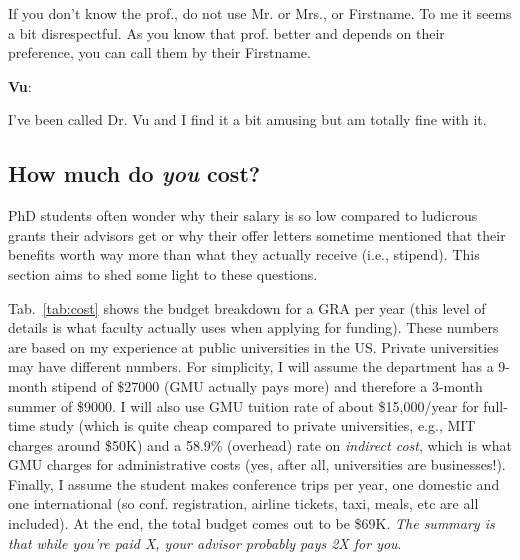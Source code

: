 \documentclass[11pt]{article}
\newenvironment{commentbox}[1][]{
\small
    \begin{cbox}
    \textbf{#1}: 
 }{
   \end{cbox}
}
\begin{document}
If you don't know the prof., do not use Mr. or Mrs., or Firstname. To me it seems a bit disrespectful. As you know that prof. better and depends on their preference, you can call them by their Firstname.


\begin{commentbox}[Vu]
    I've been called Dr. Vu and I find it a bit amusing but am totally fine with it.
\end{commentbox}

\subsection{How much do \emph{you} cost?}\label{sec:ra-cost}
PhD students often wonder why their salary is so low compared to ludicrous grants their advisors get or why their offer letters sometime mentioned that their benefits worth way more than what they actually receive (i.e., stipend).  This section aims to shed some light to these questions.

Tab.~\ref{tab:cost} shows the budget breakdown for a GRA per year (this level of details is what faculty actually uses when applying for funding).
These numbers are based on my experience at public universities in the US.  Private universities may have different numbers.  For simplicity, I will assume the department has a 9-month stipend of \$27000 (GMU actually pays more) and therefore a 3-month summer of \$9000. I will also use GMU tuition rate of about \$15,000/year for full-time study (which is quite cheap compared to private universities, e.g., MIT charges around \$50K) and a 58.9\% (overhead) rate on \emph{indirect cost}, which is what GMU charges for administrative costs (yes, after all, universities are businesses!).  Finally, I assume the student makes conference trips per year, one domestic and one international (so conf. registration, airline tickets, taxi, meals, etc are all included). At the end, the total budget comes out to be \$69K.  \emph{The summary is that while you're paid X, your advisor probably pays 2X for you}.
\end{document}
